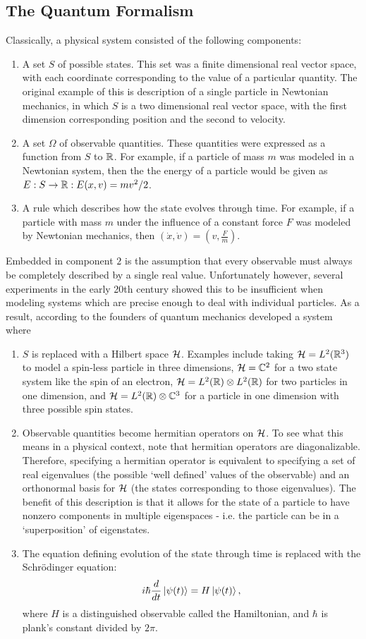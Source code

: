 \documentclass[a4paper]{article}
\begin{document}
\subsection{The Quantum Formalism}
Classically, a physical system consisted of the following components: 
\begin{enumerate}
    \item A set $S$ of possible states. This set was a finite dimensional real vector space, with each coordinate corresponding to the value of a particular quantity. The original example of this is description of a single particle in Newtonian mechanics, in which $S$ is a two dimensional real vector space, with the first dimension corresponding position and the second to velocity.
    \item A set $\Omega$ of observable quantities. These quantities were expressed as a function from $S$ to $\mathbb{R}$. For example, if a particle of mass $m$ was modeled in a Newtonian system, then the the energy of a particle would be given as $E: S \to \mathbb{R} : E(x, v) = mv^2/2$.
    \item A rule which describes how the state evolves through time. For example, if a particle with mass $m$ under the influence of a constant force $F$ was modeled by Newtonian mechanics, then $(\dot{x}, \dot{v}) = (v, \frac{F}{m})$.
\end{enumerate}
Embedded in component $2$ is the assumption that every observable must always be completely described by a single real value. Unfortunately however, several experiments in the early 20th century showed this to be insufficient when modeling systems which are precise enough to deal with individual particles. As a result, according to \cite{shankar} the founders of quantum mechanics developed a system where
\begin{enumerate}
    \item $S$ is replaced with a Hilbert space $\mathcal{H}$. Examples include taking $\mathcal{H} = L^2(\mathbb{R}^3)$ to model a spin-less particle in three dimensions, $\mathcal{H} = \mathbb{C}^2$ for a two state system like the spin of an electron, $\mathcal{H} = L^2(\mathbb{R}) \otimes L^2(\mathbb{R})$ for two particles in one dimension, and $\mathcal{H} = L^2(\mathbb{R}) \otimes \mathbb{C}^3$ for a particle in one dimension with three possible spin states.
    \item Observable quantities become hermitian operators on $\mathcal{H}$. To see what this means in a physical context, note that hermitian operators are diagonalizable. Therefore, specifying a hermitian operator is equivalent to specifying a set of real eigenvalues (the possible `well defined' values of the observable) and an orthonormal basis for $\mathcal{H}$ (the states corresponding to those eigenvalues). The benefit of this  description is that it allows for the state of a particle to have nonzero components in multiple eigenspaces - i.e. the particle can be in a `superposition' of eigenstates. 
    \item The equation defining evolution of the state through time is replaced with the Schr\"{o}dinger equation: 
    $$i\hbar\frac{d}{dt}\left\lvert \psi(t) \right\rangle = H\left\lvert \psi(t) \right\rangle,$$
    where $H$ is a distinguished observable called the Hamiltonian, and $\hbar$ is plank's constant divided by $2 \pi$.
\end{enumerate}
\end{document}

